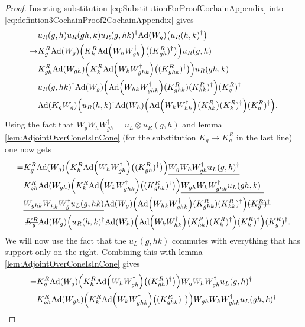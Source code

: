 \documentclass[12pt,a4paper,twoside]{article}
\numberwithin{equation}{section}
\begin{document}
\begin{proof}
	 Inserting substitution \eqref{eq:SubstitutionForProofCochainAppendix} into \eqref{eq:defintion3CochainProof2CochainAppendix} gives
	\begin{align}
		&u_R(g,h)u_R(gh,k)u_R(g,hk)^\dagger\Ad{W_g}\left(u_R(h,k)^\dagger\right)\\
		\rightarrow&K_g^R\Ad{W_g}\left(K_h^R\Ad{W_hW_{gh}^\dagger}\left((K_{gh}^R)^\dagger\right)\right)u_
		R(g,h)\\
		\nonumber
		&K_{gh}^R\Ad{W_{gh}}\left(K_k^R\Ad{W_kW_{ghk}^\dagger}\left((K_{ghk}^R)^\dagger\right)\right)u_
		R(gh,k)\\
		\nonumber
		&u_R(g,hk)^\dagger \Ad{W_g}\left( \Ad{W_{hk}W_{ghk}^\dagger}(K^R_{ghk})(K^R_{hk})^{\dagger} \right)(K^R_g)^\dagger\\
		\nonumber
		&\Ad{K_gW_g}\left(u_R(h,k)^\dagger \Ad{W_h}\left(\Ad{W_kW_{hk}^\dagger}\left(K_{hk}^R\right)(K^R_k)^\dagger\right)(K^R_h)^\dagger\right).
	\end{align}
	Using the fact that $W_gW_hW_{gh}^\dagger=u_L\otimes u_R(g,h)$ and lemma \ref{lem:AdjointOverConeIsInCone} (for the substitution $K_g\rightarrow K_g^R$ in the last line) one now gets
	\begin{align}
		=&K_g^R\Ad{W_g}\left(K_h^R\Ad{W_hW_{gh}^\dagger}\left((K_{gh}^R)^\dagger\right)\right)\underline{W_gW_hW_{gh}^\dagger u_L(g,h)^\dagger}\\
		\nonumber
		&K_{gh}^R\Ad{W_{gh}}\left(K_k^R\Ad{W_kW_{ghk}^\dagger}\left((K_{ghk}^R)^\dagger\right)\right) \underline{W_{gh}W_kW_{ghk}^\dagger u_L(gh,k)^\dagger}\\
		\nonumber
		&\underline{W_{ghk}W_{hk}^\dagger W_{g}^\dagger u_L(g,hk)} \Ad{W_g}\left( \Ad{W_{hk}W_{ghk}^\dagger}(K^R_{ghk})(K^R_{hk})^{\dagger} \right)\stkout{(K^R_g)^\dagger}\\
		\nonumber
		&\:\stkout{K^R_g}\Ad{W_g}\left(u_R(h,k)^\dagger \Ad{W_h}\left(\Ad{W_kW_{hk}^\dagger}\left(K_{hk}^R\right)(K^R_k)^\dagger\right)(K^R_h)^\dagger\right)(K^R_g)^\dagger.
	\end{align}
	We will now use the fact that the $u_L(g,hk)$ commutes with everything that has support only on the right. Combining this with lemma \ref{lem:AdjointOverConeIsInCone} gives
	\begin{align}
		=&K_g^R\Ad{W_g}\left(K_h^R\Ad{W_hW_{gh}^\dagger}\left((K_{gh}^R)^\dagger\right)\right)W_gW_hW_{gh}^\dagger u_L(g,h)^\dagger\\
		\nonumber
		&K_{gh}^R\Ad{W_{gh}}\left(K_k^R\Ad{W_kW_{ghk}^\dagger}\left((K_{ghk}^R)^\dagger\right)\right) W_{gh}W_kW_{ghk}^\dagger u_L(gh,k)^\dagger\\

\end{align}
\end{proof}
\end{document}
